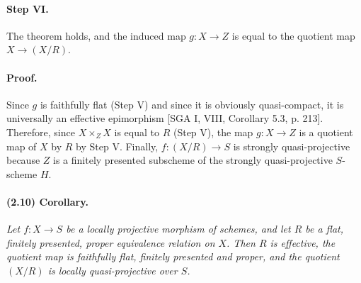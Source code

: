 \paragraph{Step VI.}
The theorem holds, and the induced map $g:X\to Z$ is equal to the quotient
map $X\to(X/R)$.

\paragraph{Proof.}
Since $g$ is faithfully flat (Step V) and since it is obviously
quasi-compact, it is universally an effective epimorphism [SGA I, VIII,
Corollary 5.3, p. 213]. Therefore, since $X\times_Z X$ is equal to $R$
(Step V), the map $g:X\to Z$ is a quotient map of $X$ by $R$ by Step V.
Finally, $f:(X/R)\to S$ is strongly quasi-projective because $Z$ is a
finitely presented subscheme of the strongly quasi-projective $S$-scheme
$H$.

\paragraph{(2.10) Corollary.}
\textit{Let $f:X\to S$ be a locally projective morphism of schemes, and let
$R$ be a flat, finitely presented, proper equivalence relation on $X$. Then
$R$ is effective, the quotient map is faithfully flat, finitely presented
and proper, and the quotient $(X/R)$ is locally quasi-projective over $S$.}
